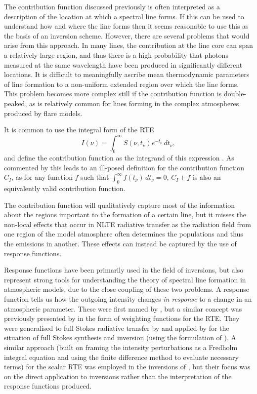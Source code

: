 The contribution function discussed previously is often interpreted as a description of the location at which a spectral line forms.
If this can be used to understand how and where the line forms then it seems reasonable to use this as the basis of an inversion scheme.
However, there are several problems that would arise from this approach.
In many lines, the contribution at the line core can span a relatively large region, and thus there is a high probability that photons measured at the same wavelength have been produced in significantly different locations.
It is difficult to meaningfully ascribe mean thermodynamic parameters of line formation to a non-uniform extended region over which the line forms.
This problem becomes more complex still if the contribution function is double-peaked, as is relatively common for lines forming in the complex atmospheres produced by flare models.

It is common to use the integral form of the RTE
\begin{equation}
    I(\nu) = \int_0^\infty S(\nu, t_\nu) e^{-t_\nu}\, dt_\nu,
\end{equation}
and define the contribution function as the integrand of this expression \citep{Carlsson1997,DelToroIniesta2003}.
As commented by \citet{DelToroIniesta2003} this leads to an ill-posed definition for the contribution function $C_I$, as for any function $f$ such that $\int_0^\infty f(t_\nu)\, dt_\nu = 0$, $C_I + f$ is also an equivalently valid contribution function.

The contribution function will qualitatively capture most of the information about the regions important to the formation of a certain line, but it misses the non-local effects that occur in NLTE radiative transfer as the radiation field from one region of the model atmosphere often determines the populations and thus the emissions in another.
These effects can instead be captured by the use of response functions.

Response functions have been primarily used in the field of inversions, but also represent strong tools for understanding the theory of spectral line formation in atmospheric models, due to the close coupling of these two problems.
A response function tells us how the outgoing intensity changes \emph{in response} to a change in an atmospheric parameter.
These were first named by \citet{Beckers1975}, but a similar concept was previously presented by \citet{Mein1971} in the form of weighting functions for the RTE.
They were generalised to full Stokes radiative transfer by \citet{LandiDeglInnocenti1977} and applied by \citet{1992RuizCobo} for the situation of full Stokes synthesis and inversion (using the formulation of \citet{SanchezAlmeida1992}).
A similar approach (built on framing the intensity perturbations as a Fredholm integral equation and using the finite difference method to evaluate necessary terms) for the scalar RTE was employed in the inversions of \citet{Metcalf1990a}, but their focus was on the direct application to inversions rather than the interpretation of the response functions produced.

